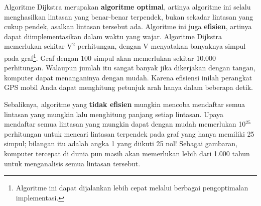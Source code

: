 Algoritme Dijkstra merupakan \textbf{algoritme optimal}, artinya algoritme ini selalu menghasilkan lintasan yang benar-benar terpendek, bukan sekadar lintasan yang cukup pendek, asalkan lintasan tersebut ada.  Algoritme ini juga \textbf{efisien}, artinya dapat diimplementasikan dalam waktu yang wajar.  Algoritme Dijkstra memerlukan sekitar V$^2$ perhitungan, dengan V menyatakan banyaknya simpul pada graf\footnote{Algoritme ini dapat dijalankan lebih cepat melalui berbagai pengoptimalan implementasi.}.  Graf dengan 100 simpul akan memerlukan sekitar 10.000 perhitungan.  Walaupun jumlah itu sangat banyak jika dikerjakan dengan tangan, komputer dapat menanganinya dengan mudah.  Karena efisiensi inilah perangkat GPS mobil Anda dapat menghitung petunjuk arah hanya dalam beberapa detik.  
 
Sebaliknya, algoritme yang \textbf{tidak efisien} mungkin mencoba mendaftar semua lintasan yang mungkin lalu menghitung panjang setiap lintasan.  Upaya mendaftar semua lintasan yang mungkin dapat dengan mudah memerlukan 10$^{25}$ perhitungan untuk mencari lintasan terpendek pada graf yang hanya memiliki 25 simpul; bilangan itu adalah angka 1 yang diikuti 25 nol!  Sebagai gambaran, komputer tercepat di dunia pun masih akan memerlukan lebih dari 1.000 tahun untuk menganalisis semua lintasan tersebut.

